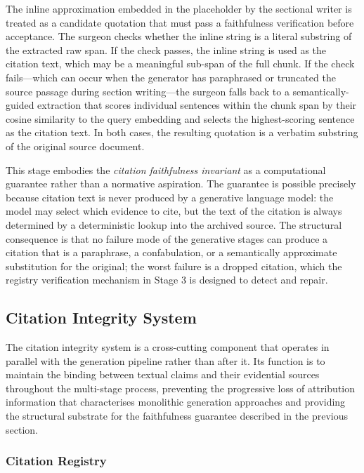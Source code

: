 The inline approximation embedded in the placeholder by the sectional writer is treated as a
candidate quotation that must pass a faithfulness verification before acceptance. The surgeon
checks whether the inline string is a literal substring of the extracted raw span. If the check
passes, the inline string is used as the citation text, which may be a meaningful sub-span of
the full chunk. If the check fails---which can occur when the generator has paraphrased or
truncated the source passage during section writing---the surgeon falls back to a
semantically-guided extraction that scores individual sentences within the chunk span by
their cosine similarity to the query embedding and selects the highest-scoring sentence as the
citation text. In both cases, the resulting quotation is a verbatim substring of the original
source document.

This stage embodies the \textit{citation faithfulness invariant} as a computational guarantee
rather than a normative aspiration. The guarantee is possible precisely because citation text is
never produced by a generative language model: the model may select which evidence to cite, but
the text of the citation is always determined by a deterministic lookup into the archived source.
The structural consequence is that no failure mode of the generative stages can produce a
citation that is a paraphrase, a confabulation, or a semantically approximate substitution for
the original; the worst failure is a dropped citation, which the registry verification mechanism
in Stage 3 is designed to detect and repair.


\subsection{Citation Integrity System}
\label{sec:citation-integrity}

The citation integrity system is a cross-cutting component that operates in parallel with the
generation pipeline rather than after it. Its function is to maintain the binding between
textual claims and their evidential sources throughout the multi-stage process, preventing
the progressive loss of attribution information that characterises monolithic generation
approaches and providing the structural substrate for the faithfulness guarantee described in
the previous section.

\subsubsection{Citation Registry}

